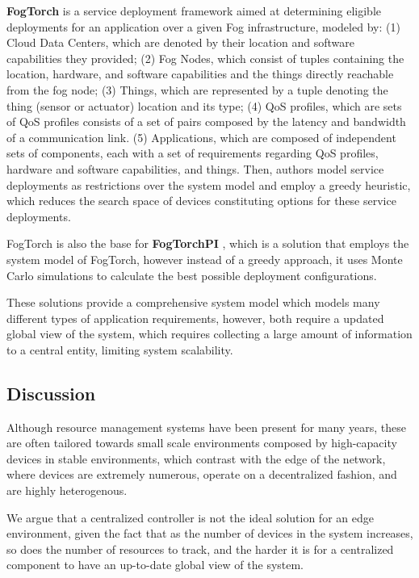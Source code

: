 \textbf{FogTorch} \cite{Brogi2017} is a service deployment framework aimed at determining eligible deployments for an application over a given Fog infrastructure, modeled by: (1) Cloud Data Centers, which are denoted by their location and software capabilities they provided; (2) Fog Nodes, which consist of tuples containing the location, hardware, and software capabilities and the things directly reachable from the fog node; (3) Things, which are represented by a tuple denoting the thing (sensor or actuator) location and its type; (4) QoS profiles, which are sets of QoS profiles consists of a set of pairs composed by the latency and bandwidth of a communication link. (5) Applications, which are composed of independent sets of components, each with a set of requirements regarding QoS profiles, hardware and software capabilities, and things. Then, authors model service deployments as restrictions over the system model and employ a greedy heuristic, which reduces the search space of devices constituting options for these service deployments.

FogTorch is also the base for \textbf{FogTorchPI} \cite{brogi2017best}, which is a solution that employs the system model of FogTorch, however instead of a greedy approach, it uses Monte Carlo simulations to calculate the best possible deployment configurations.

These solutions provide a comprehensive system model which models many different types of application requirements, however, both require a updated global view of the system, which requires collecting a large amount of information to a central entity, limiting system scalability.

\subsection{Discussion}

Although resource management systems have been present for many years, these are often tailored towards small scale environments composed by high-capacity devices in stable environments, which contrast with the edge of the network, where devices are extremely numerous, operate on a decentralized fashion, and are highly heterogenous.

We argue that a centralized controller is not the ideal solution for an edge environment, given the fact that as the number of devices in the system increases, so does the number of resources to track, and the harder it is for a centralized component to have an up-to-date global view of the system.

